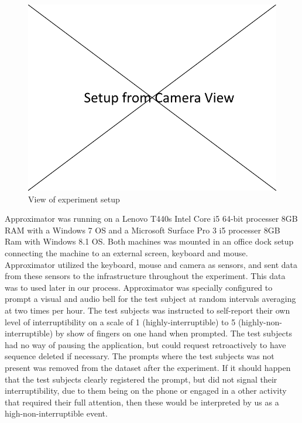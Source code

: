 \documentclass{sigchi}
\begin{document}
\begin{figure}
  \centering
  \includegraphics[width=\columnwidth]{figures/experiment_setup.png}
  \caption{View of experiment setup}
  \label{fig:experiment}
\end{figure}

Approximator was running on a Lenovo T440s Intel Core i5 64-bit processer 8GB RAM with a Windows 7 OS and a Microsoft Surface Pro 3 i5 processer 8GB Ram with Windows 8.1 OS.
Both machines was mounted in an office dock setup connecting the machine to an external screen, keyboard and mouse.
Approximator utilized the keyboard, mouse and camera as sensors, and sent data from these sensors to the infrastructure throughout the experiment.
This data was to used later in our process.
Approximator was specially configured to prompt a visual and audio bell for the test subject at random intervals averaging at two times per hour.
The test subjects was instructed to self-report their own level of interruptibility on a scale of 1 (highly-interruptible) to 5 (highly-non-interruptible) by show of fingers on one hand when prompted.
The test subjects had no way of pausing the application, but could request retroactively to have sequence deleted if necessary.
The prompts where the test subjects was not present was removed from the dataset after the experiment.
If it should happen that the test subjects clearly registered the prompt, but did not signal their interruptibility, due to them being on the phone or engaged in a other activity that required their full attention, then these would be interpreted by us as a high-non-interruptible event.
\end{document}
